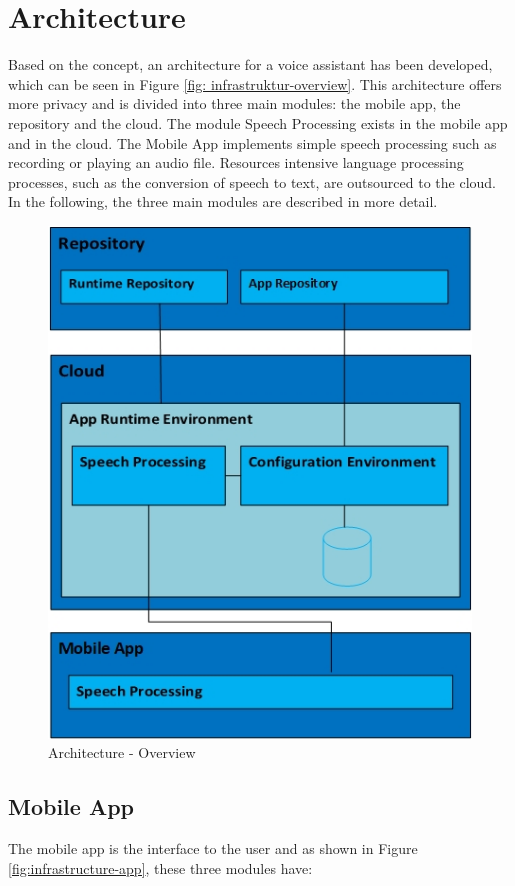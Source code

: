 \section{Architecture}\label{sec:architecure}
Based on the concept, an architecture for a voice assistant has been developed, which can be seen in Figure \ref{fig: infrastruktur-overview}. This architecture offers more privacy and is divided into three main modules: the mobile app, the repository and the cloud. The module \glqq Speech Processing\grqq{} exists in the mobile app and in the cloud. The Mobile App implements simple speech processing such as recording or playing an audio file. Resources intensive language processing processes, such as the conversion of speech to text, are outsourced to the cloud. In the following, the three main modules are described in more detail.

\begin{figure}[h!]
	\centering
	\includegraphics[width=0.8\linewidth]{Picture/Infrastruktur-Overview.jpg}
	\caption[Architecture - Overview]{Architecture - Overview}
	\label{fig:infrastruktur-overview}
\end{figure}

\subsection{Mobile App}
The mobile app is the interface to the user and as shown in Figure \ref{fig:infrastructure-app}, these three modules have:

